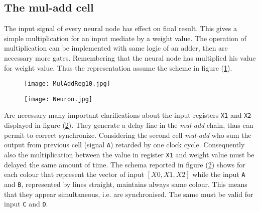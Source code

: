 %
\subsection{The mul-add cell}
\label{ssec:The-mul-add-cell} 
The input signal of every neural node has effect on final result. This gives a
simple multiplication for an input mediate by a weight value. The operation of
multiplication can be implemented with same logic of an adder, then are
necessary more gates. 
Remembering that the neural node has multiplied his value for weight value. 
Thus the representation assume the scheme in figure
(\ref{fig:mul-add-register}).
%
\begin{figure}[htb]
	\centering
	\texttt{[image: MulAddReg10.jpg]}
	\label{fig:mul-add-register}
\end{figure}
%
%
%
\begin{figure}[htb]
	\centering
	\texttt{[image: Neuron.jpg]}
	\label{fig:3-input-neuron}
\end{figure}
%
%
Are necessary many important clarifications about the input registers
\texttt{X1} and \texttt{X2} displayed in figure (\ref{fig:3-input-neuron}). They
generate a delay line in the \emph{mul-add} chain, thus can permit to correct
synchronize. Considering the second cell \emph{mul-add} who sum the output from
previous cell (signal \texttt{A}) retarded by one clock cycle. Consequently also
the multiplication between the value in register \texttt{X1} and weight value
must be delayed the same amount of time. The schema reported in figure
(\ref{fig:3-input-neuron}) shows for each colour that represent the vector of
input \texttt{$[X0, X1, X2]$} while the input \texttt{A} and \texttt{B},
represented by lines straight, maintains always same colour. This means that
they appear simultaneous, i.e. are synchronised. The same must be valid for
input \texttt{C} and \texttt{D}.
%
